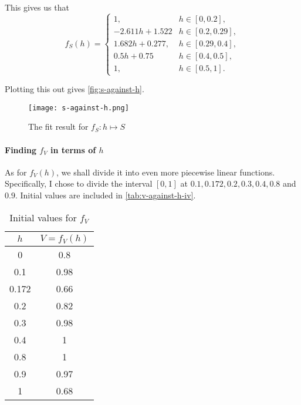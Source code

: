 This gives us that
\[
    f_S(h) = \begin{cases}
        1,              & h \in [0, 0.2],    \\
        -2.611h + 1.522 & h \in [0.2, 0.29], \\
        1.682h + 0.277, & h \in [0.29, 0.4], \\
        0.5h + 0.75     & h \in [0.4, 0.5],  \\
        1,              & h \in [0.5, 1].
    \end{cases}
\]

Plotting this out gives \autoref{fig:s-against-h}.

\begin{figure}[htp]
    \centering
    \texttt{[image: s-against-h.png]}
    \caption{The fit result for \(f_S: h \mapsto S\)}
    \label{fig:s-against-h}
\end{figure}

\paragraph{Finding \(f_V\) in terms of \(h\)}

As for \(f_V(h)\), we shall divide it into even more piecewise linear functions. Specifically, I chose to divide the interval \([0, 1]\) at \(0.1, 0.172, 0.2, 0.3, 0.4, 0.8\) and \(0.9\). Initial values are included in \autoref{tab:v-against-h-iv}.

\begin{table}[htp]
    \centering

    \begin{tabular}{cc}
        \(h\) & \(V = f_V(h)\) \\
        \hline
        0     & 0.8            \\
        0.1   & 0.98           \\
        0.172 & 0.66           \\
        0.2   & 0.82           \\
        0.3   & 0.98           \\
        0.4   & 1              \\
        0.8   & 1              \\
        0.9   & 0.97           \\
        1     & 0.68
    \end{tabular}
    \caption{Initial values for \(f_V\)}
    \label{tab:v-against-h-iv}
\end{table}

